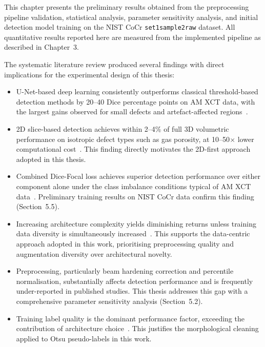 
This chapter presents the preliminary results obtained from the preprocessing pipeline validation,
statistical analysis, parameter sensitivity analysis, and initial detection model training on the
NIST CoCr \texttt{set1sample2raw} dataset. All quantitative results reported here are measured from
the implemented pipeline as described in Chapter~3.

The systematic literature review produced several findings with direct implications for the
experimental design of this thesis:
\begin{itemize}
\item U-Net-based deep learning consistently outperforms classical threshold-based detection methods
  by 20--40 Dice percentage points on AM XCT data, with the largest gains observed for small defects
  and artefact-affected regions~\citep{Wong2022}.
\item 2D slice-based detection achieves within 2--4\% of full 3D volumetric performance on isotropic
  defect types such as gas porosity, at 10--50$\times$ lower computational cost~\citep{Wong2021}.
  This finding directly motivates the 2D-first approach adopted in this thesis.
\item Combined Dice-Focal loss achieves superior detection performance over either component alone
  under the class imbalance conditions typical of AM XCT data~\citep{Bellens2021}. Preliminary
  training results on NIST CoCr data confirm this finding (Section~5.5).
\item Increasing architecture complexity yields diminishing returns unless training data diversity is
  simultaneously increased~\citep{Zubayer2023}. This supports the data-centric approach adopted in
  this work, prioritising preprocessing quality and augmentation diversity over architectural
  novelty.
\item Preprocessing, particularly beam hardening correction and percentile normalisation,
  substantially affects detection performance and is frequently under-reported in published studies.
  This thesis addresses this gap with a comprehensive parameter sensitivity analysis
  (Section~5.2).
\item Training label quality is the dominant performance factor, exceeding the contribution of
  architecture choice~\citep{Liu2024}. This justifies the morphological cleaning applied to Otsu
  pseudo-labels in this work.
\end{itemize}

